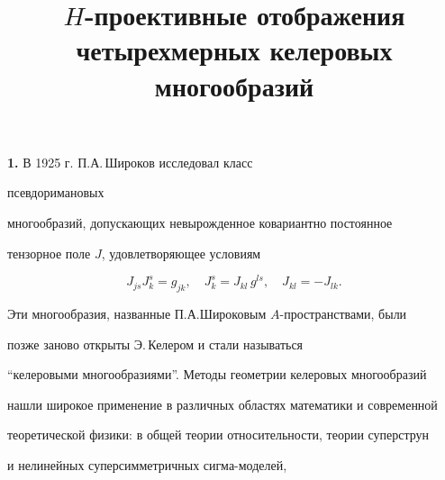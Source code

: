 \title{$H$-проективные отображения\\


четырехмерных келеровых многообразий}









\date{}







\pagestyle{plain} %













\maketitle


\label{begin}





{\bf 1.} В 1925 г. П.А.\,Широков \cite{shir1} исследовал класс


псевдоримановых


многообразий, допускающих невырожденное ковариантно постоянное


тензорное поле $J$, удовлетворяющее условиям


$$


J_{js}J^s_k = g_{jk}, \quad J^s_k = J_{kl}\,g^{ls}, \quad J_{kl}=-J_{lk}.


$$


Эти многообразия, названные П.А.Широковым $A$-пространствами, были


позже заново открыты Э.\,Келером \cite{kahl} и стали называться


``келеровыми многообразиями''. Методы геометрии келеровых многообразий


нашли широкое применение в различных областях математики и современной


теоретической физики: в общей теории относительности, теории суперструн


и нелинейных суперсимметричных сигма-моделей,


